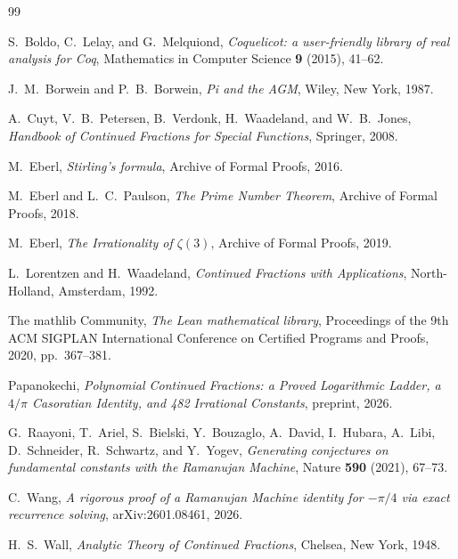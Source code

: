 \documentclass[11pt,reqno]{amsart}
\theoremstyle{plain}
\theoremstyle{definition}
\theoremstyle{remark}
\begin{document}
\begin{thebibliography}{99}

S.~Boldo, C.~Lelay, and G.~Melquiond,
\emph{Coquelicot: a user-friendly library of real analysis for Coq},
Mathematics in Computer Science \textbf{9} (2015), 41--62.

J.~M.~Borwein and P.~B.~Borwein,
\emph{Pi and the AGM},
Wiley, New York, 1987.

A.~Cuyt, V.~B.~Petersen, B.~Verdonk, H.~Waadeland, and W.~B.~Jones,
\emph{Handbook of Continued Fractions for Special Functions},
Springer, 2008.

M.~Eberl,
\emph{Stirling's formula},
Archive of Formal Proofs, 2016.

M.~Eberl and L.~C.~Paulson,
\emph{The Prime Number Theorem},
Archive of Formal Proofs, 2018.

M.~Eberl,
\emph{The Irrationality of $\zeta(3)$},
Archive of Formal Proofs, 2019.

L.~Lorentzen and H.~Waadeland,
\emph{Continued Fractions with Applications},
North-Holland, Amsterdam, 1992.

The mathlib Community,
\emph{The Lean mathematical library},
Proceedings of the 9th ACM SIGPLAN International Conference on Certified Programs and Proofs, 2020, pp.~367--381.

Papanokechi,
\emph{Polynomial Continued Fractions: a Proved Logarithmic Ladder, a $4/\pi$ Casoratian Identity, and 482 Irrational Constants},
preprint, 2026.

G.~Raayoni, T.~Ariel, S.~Bielski, Y.~Bouzaglo, A.~David, I.~Hubara,
A.~Libi, D.~Schneider, R.~Schwartz, and Y.~Yogev,
\emph{Generating conjectures on fundamental constants with the Ramanujan Machine},
Nature \textbf{590} (2021), 67--73.

C.~Wang,
\emph{A rigorous proof of a Ramanujan Machine identity for $-\pi/4$ via exact recurrence solving},
arXiv:2601.08461, 2026.

H.~S.~Wall,
\emph{Analytic Theory of Continued Fractions},
Chelsea, New York, 1948.

\end{thebibliography}
\end{document}
